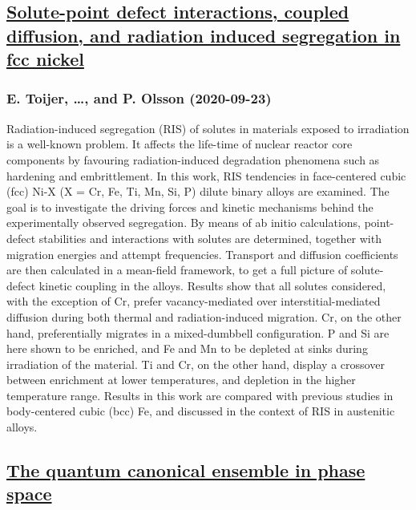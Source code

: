 \subsection*{\href{http://arxiv.org/abs/2009.11132v1}{Solute-point defect interactions, coupled diffusion, and radiation  induced segregation in fcc nickel}}
\subsubsection*{E. Toijer, \dots, and P. Olsson (2020-09-23)}
Radiation-induced segregation (RIS) of solutes in materials exposed to
irradiation is a well-known problem. It affects the life-time of nuclear
reactor core components by favouring radiation-induced degradation phenomena
such as hardening and embrittlement. In this work, RIS tendencies in
face-centered cubic (fcc) Ni-X (X = Cr, Fe, Ti, Mn, Si, P) dilute binary alloys
are examined. The goal is to investigate the driving forces and kinetic
mechanisms behind the experimentally observed segregation. By means of ab
initio calculations, point-defect stabilities and interactions with solutes are
determined, together with migration energies and attempt frequencies. Transport
and diffusion coefficients are then calculated in a mean-field framework, to
get a full picture of solute-defect kinetic coupling in the alloys. Results
show that all solutes considered, with the exception of Cr, prefer
vacancy-mediated over interstitial-mediated diffusion during both thermal and
radiation-induced migration. Cr, on the other hand, preferentially migrates in
a mixed-dumbbell configuration. P and Si are here shown to be enriched, and Fe
and Mn to be depleted at sinks during irradiation of the material. Ti and Cr,
on the other hand, display a crossover between enrichment at lower
temperatures, and depletion in the higher temperature range. Results in this
work are compared with previous studies in body-centered cubic (bcc) Fe, and
discussed in the context of RIS in austenitic alloys.

\subsection*{\href{http://arxiv.org/abs/2009.11125v1}{The quantum canonical ensemble in phase space}}

